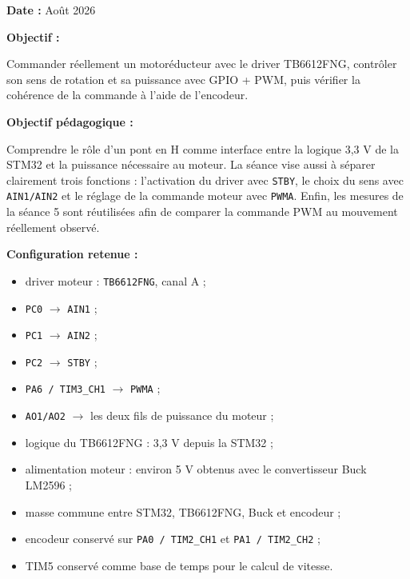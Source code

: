 \documentclass[11pt,a4paper]{article}
\begin{document}
	\begin{sessionbox}
		
		\textbf{Date :} Août 2026
		
		\vspace{0.3cm}
		
		\textbf{Objectif :}
		
		Commander réellement un motoréducteur avec le driver TB6612FNG, contrôler son sens de rotation et sa puissance avec GPIO + PWM, puis vérifier la cohérence de la commande à l'aide de l'encodeur.
		
		\vspace{0.3cm}
		
		\textbf{Objectif pédagogique :}
		
		Comprendre le rôle d'un pont en H comme interface entre la logique 3,3 V de la STM32 et la puissance nécessaire au moteur. La séance vise aussi à séparer clairement trois fonctions : l'activation du driver avec \texttt{STBY}, le choix du sens avec \texttt{AIN1/AIN2} et le réglage de la commande moteur avec \texttt{PWMA}. Enfin, les mesures de la séance 5 sont réutilisées afin de comparer la commande PWM au mouvement réellement observé.
		
		\vspace{0.3cm}
		
		\textbf{Configuration retenue :}
		
		\begin{itemize}
			\item driver moteur : \texttt{TB6612FNG}, canal A ;
			\item \texttt{PC0} $\rightarrow$ \texttt{AIN1} ;
			\item \texttt{PC1} $\rightarrow$ \texttt{AIN2} ;
			\item \texttt{PC2} $\rightarrow$ \texttt{STBY} ;
			\item \texttt{PA6 / TIM3\_CH1} $\rightarrow$ \texttt{PWMA} ;
			\item \texttt{AO1/AO2} $\rightarrow$ les deux fils de puissance du moteur ;
			\item logique du TB6612FNG : 3,3 V depuis la STM32 ;
			\item alimentation moteur : environ 5 V obtenus avec le convertisseur Buck LM2596 ;
			\item masse commune entre STM32, TB6612FNG, Buck et encodeur ;
			\item encodeur conservé sur \texttt{PA0 / TIM2\_CH1} et \texttt{PA1 / TIM2\_CH2} ;
			\item TIM5 conservé comme base de temps pour le calcul de vitesse.
		\end{itemize}
		

\end{sessionbox}
\end{document}
